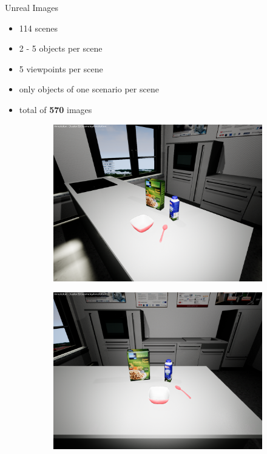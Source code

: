 \documentclass[]{beamer}
\begin{document}
\begin{frame}{Unreal Images}
	\begin{itemize}
		\item 114 scenes
		\item 2 - 5 objects per scene
		\item 5 viewpoints per scene
		\item only objects of one scenario per scene
		\item total of \textbf{570} images
	\end{itemize}
	\begin{figure}
\centering
	\begin{subfigure}[b]{0.3\textwidth}
		\includegraphics[scale=.07]{../thesis/img/chapter3/sceneEx_1}
	\end{subfigure}
	\quad
	\begin{subfigure}[b]{0.3\textwidth}
		\includegraphics[scale=.07]{../thesis/img/chapter3/sceneEx_2}	

\end{subfigure}
\end{figure}
\end{frame}
\end{document}
